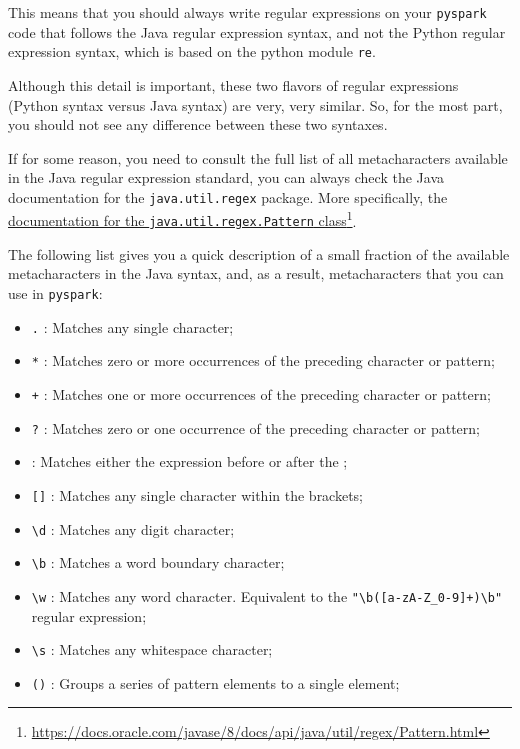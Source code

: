 \documentclass[
  11pt,
  letterpaper,
  DIV=11,
  numbers=noendperiod]{scrreprt}
\providecommand{\tightlist}{%
  \setlength{\itemsep}{0pt}\setlength{\parskip}{0pt}}\usepackage{longtable,booktabs,array}
\begin{document}
This means that you should always write regular expressions on your
\texttt{pyspark} code that follows the Java regular expression syntax,
and not the Python regular expression syntax, which is based on the
python module \texttt{re}.

Although this detail is important, these two flavors of regular
expressions (Python syntax versus Java syntax) are very, very similar.
So, for the most part, you should not see any difference between these
two syntaxes.

If for some reason, you need to consult the full list of all
metacharacters available in the Java regular expression standard, you
can always check the Java documentation for the \texttt{java.util.regex}
package. More specifically, the
\href{https://docs.oracle.com/javase/8/docs/api/java/util/regex/Pattern.html}{documentation
for the \texttt{java.util.regex.Pattern} class}\footnote{\url{https://docs.oracle.com/javase/8/docs/api/java/util/regex/Pattern.html}}.

The following list gives you a quick description of a small fraction of
the available metacharacters in the Java syntax, and, as a result,
metacharacters that you can use in \texttt{pyspark}:

\begin{itemize}
\tightlist
\item
  \texttt{.} : Matches any single character;
\item
  \texttt{*} : Matches zero or more occurrences of the preceding
  character or pattern;
\item
  \texttt{+} : Matches one or more occurrences of the preceding
  character or pattern;
\item
  \texttt{?} : Matches zero or one occurrence of the preceding character
  or pattern;
\item
  \texttt{\textbar{}} : Matches either the expression before or after
  the \texttt{\textbar{}};
\item
  \texttt{{[}{]}} : Matches any single character within the brackets;
\item
  \texttt{\textbackslash{}d} : Matches any digit character;
\item
  \texttt{\textbackslash{}b} : Matches a word boundary character;
\item
  \texttt{\textbackslash{}w} : Matches any word character. Equivalent to
  the \texttt{"\textbackslash{}b({[}a-zA-Z\_0-9{]}+)\textbackslash{}b"}
  regular expression;
\item
  \texttt{\textbackslash{}s} : Matches any whitespace character;
\item
  \texttt{()} : Groups a series of pattern elements to a single element;
\end{itemize}
\end{document}
